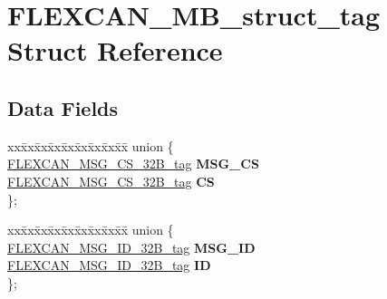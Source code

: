 \hypertarget{structFLEXCAN__MB__struct__tag}{}\section{F\+L\+E\+X\+C\+A\+N\+\_\+\+M\+B\+\_\+struct\+\_\+tag Struct Reference}
\label{structFLEXCAN__MB__struct__tag}
\subsection*{Data Fields}
\begin{DoxyCompactItemize}
\item 
\mbox{\label{structFLEXCAN__MB__struct__tag_aca2a66829a782625eb3779622d9e6670}} 
\begin{tabbing}
xx\=xx\=xx\=xx\=xx\=xx\=xx\=xx\=xx\=\kill
union \{\\
\>\mbox{\hyperlink{unionFLEXCAN__MSG__CS__32B__tag}{FLEXCAN\_MSG\_CS\_32B\_tag}} {\bfseries MSG\_CS}\\
\>\mbox{\hyperlink{unionFLEXCAN__MSG__CS__32B__tag}{FLEXCAN\_MSG\_CS\_32B\_tag}} {\bfseries CS}\\
\}; \\

\end{tabbing}\item 
\mbox{\label{structFLEXCAN__MB__struct__tag_ac763c876573a809363fa531df7e6ff7d}} 
\begin{tabbing}
xx\=xx\=xx\=xx\=xx\=xx\=xx\=xx\=xx\=\kill
union \{\\
\>\mbox{\hyperlink{unionFLEXCAN__MSG__ID__32B__tag}{FLEXCAN\_MSG\_ID\_32B\_tag}} {\bfseries MSG\_ID}\\
\>\mbox{\hyperlink{unionFLEXCAN__MSG__ID__32B__tag}{FLEXCAN\_MSG\_ID\_32B\_tag}} {\bfseries ID}\\
\}; \\


\end{tabbing}
\end{DoxyCompactItemize}
